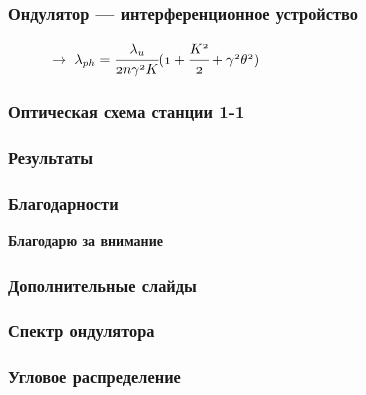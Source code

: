 \documentclass[14pt, hyperref = {colorlinks}]{beamer}
\begin{document}
\small
\begin{frame}
\frametitle{Ондулятор --- интерференционное устройство}\label{t1}
\begin{figure}[h]
		\hspace{10pt}$\longrightarrow$\hspace{10pt}
		{$\mathnormal{\lambda_{ph} = \cfrac{\lambda_{u}}{2n\gamma^2 K}(1 + \cfrac{K^2}{2} + \gamma^2\theta^2)}$}
\end{figure}
\end{frame}

\small
\begin{frame}
\frametitle{Оптическая схема станции 1-1}\label{t1}
\begin{figure}[h]
\end{figure}
\end{frame}

\small
\begin{frame}
\frametitle{Результаты}\label{t1}
\begin{figure}[h]
\end{figure}
\end{frame}

\small
\begin{frame}
\frametitle{Благодарности}\label{t1}
\begin{figure}[h]
\end{figure}
\end{frame}

\begin{frame}
\begin{center}
	\textbf{Благодарю за внимание}
\end{center}
\end{frame}

\small
\begin{frame}
\frametitle{Дополнительные слайды}\label{t1}
\begin{figure}[h]
\end{figure}
\end{frame}

\small
\begin{frame}
\frametitle{Спектр ондулятора}\label{t1}
\begin{figure}[h]
\end{figure}
\end{frame}

\small
\begin{frame}
\frametitle{Угловое распределение}\label{t1}
\begin{figure}[h]
\end{figure}
\end{frame}
\end{document}
